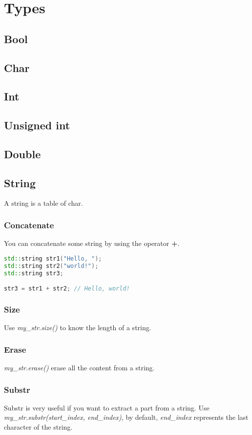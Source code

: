\documentclass[a4paper, 12pt, titlepage]{scrartcl} %
\begin{document}
\clearpage
\section{Types}

\subsection{Bool}
\subsection{Char}
\subsection{Int}
\subsection{Unsigned int}
\subsection{Double}
\subsection{String}
A string is a table of char.
\subsubsection{Concatenate}
You can concatenate some string by using the operator \textbf{+}.

\begin{lstlisting}[language=C++]
std::string str1("Hello, ");
std::string str2("world!");
std::string str3;

str3 = str1 + str2; // Hello, world!
\end{lstlisting} \vspace{5mm}

\subsubsection{Size}
Use \textit{my\_str.size()} to know the length of a string.

\subsubsection{Erase}
\textit{my\_str.erase()} erase all the content from a string.

\subsubsection{Substr}
Substr is very useful if you want to extract a part from a string. Use \textit{my\_str.substr(start\_index, end\_index)}, by default, \textit{end\_index} represents the last character of the string.
\end{document}
